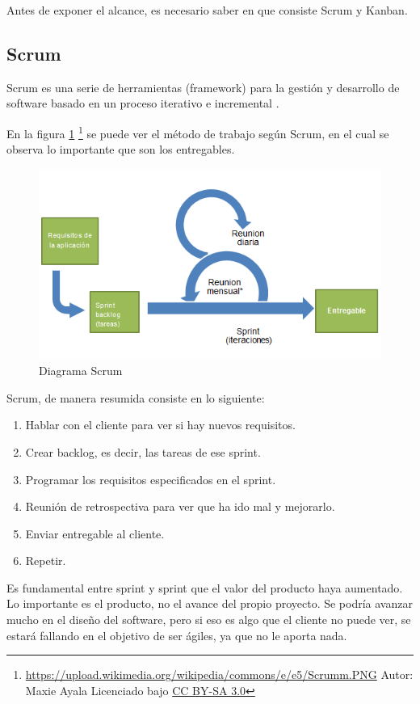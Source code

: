 Antes de exponer el alcance, es necesario saber en que consiste Scrum y Kanban.

\subsection{Scrum}
Scrum es una serie de herramientas (framework) para la gesti\'on y desarrollo de software basado en un proceso iterativo e incremental 
\cite{Scrum:WhatIsIt}.

En la figura \ref{fig:Scrum} \footnote{\url{https://upload.wikimedia.org/wikipedia/commons/e/e5/Scrumm.PNG} Autor: Maxie Ayala 
    Licenciado bajo \hyperlink{creativecommons.org/licenses/by-sa/3.0/}{CC BY-SA 3.0}} 
se puede ver el método de trabajo seg\'un Scrum, en el cual se observa lo importante que son los entregables.

\begin{figure}[h]
	\includegraphics[width=0.7\linewidth]{./Figures/Scrumm.PNG}
	\caption[Proceso iterativo Scrum]{Diagrama Scrum}
	\label{fig:Scrum}
\end{figure}

Scrum, de manera resumida consiste en lo siguiente:
\begin{enumerate}
	\item Hablar con el cliente para ver si hay nuevos requisitos.
	\item Crear backlog, es decir, las tareas de ese sprint.
	\item Programar los requisitos especificados en el sprint.
	\item Reunión de retrospectiva para ver que ha ido mal y mejorarlo.
	\item Enviar entregable al cliente.
	\item Repetir.
\end{enumerate}

Es fundamental entre sprint y sprint que el valor del producto haya aumentado. Lo importante es el producto, no el 
avance del propio proyecto. Se podr\'ia avanzar mucho en el dise\~no del software, pero si eso es algo que el cliente no 
puede ver, se estar\'a fallando en el objetivo de ser \'agiles, ya que no le aporta nada.

